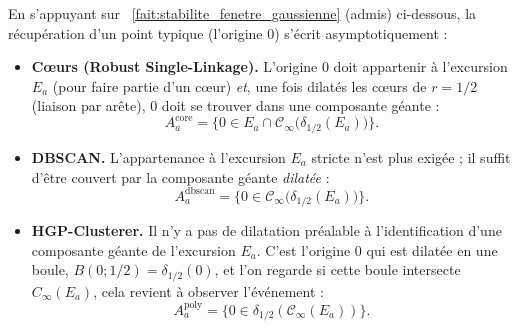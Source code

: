 

En s'appuyant sur \Fact~\ref{fait:stabilite_fenetre_gaussienne} (admis) ci-dessous, la récupération d'un point typique (l'origine $0$) s'écrit asymptotiquement :
\begin{itemize}
    \item \textbf{Cœurs (Robust Single-Linkage).} L'origine $0$ doit appartenir à l'excursion $E_a$ (pour faire partie d'un c\oe ur) \emph{et}, une fois dilatés les c\oe urs de $r=1/2$ (liaison par arête), $0$ doit se trouver dans une composante géante : 
    \[ A^{\mathrm{core}}_a = \bigl\{0\in E_a \cap \mathcal C_\infty\bigl(\delta_{1/2}(E_a)\bigr)\bigr\}.\]
    \item \textbf{DBSCAN.} L'appartenance à l'excursion $E_a$ stricte n'est plus exigée ; il suffit d'être couvert par la composante géante \emph{dilatée} : 
    \[ A^{\mathrm{dbscan}}_a = \bigl\{0\in \mathcal C_\infty\bigl(\delta_{1/2}(E_a)\bigr)\bigr\}.\]
    \item \textbf{HGP-Clusterer.} Il n'y a pas de dilatation préalable à l'identification d'une composante géante de l'excursion $E_a$. C'est l'origine $0$ qui est dilatée en une boule, $B(0 ; 1/2) = \delta_{1/2}(0)$, et l'on regarde si cette boule intersecte $C_\infty(E_a)$, cela revient à observer l'événement : 
    \[ A^{\mathrm{poly}}_a = \bigl\{0 \in  \delta_{1/2}\left( \mathcal C_\infty(E_a)\right)\bigr\}.\]
\end{itemize}


